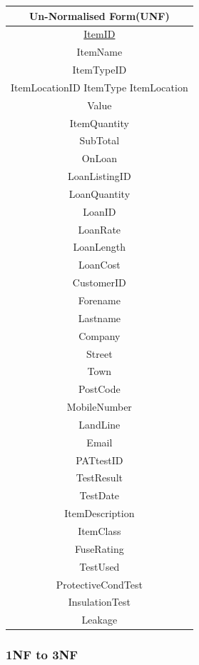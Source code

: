 \begin{center}
    \begin{tabular}{|c|}
        \hline
        \textbf{Un-Normalised Form(UNF)}\\ \hline
        \underline{ItemID}\\
        ItemName\\
        ItemTypeID\\
        ItemLocationID
        ItemType
        ItemLocation\\ 
        Value\\ 
        ItemQuantity\\ 
        SubTotal\\ 
        OnLoan\\ 
        LoanListingID\\ 
        LoanQuantity\\
        LoanID\\ 
        LoanRate\\ 
        LoanLength\\ 
        LoanCost\\ 
        CustomerID\\ 
        Forename\\ 
        Lastname\\ 
        Company\\ 
        Street\\ 
        Town\\ 
        PostCode\\ 
        MobileNumber\\ 
        LandLine\\ 
        Email\\ 
        PATtestID\\
        TestResult\\ 
        TestDate\\ 
        ItemDescription\\ 
        ItemClass\\ 
        FuseRating\\ 
        TestUsed\\ 
        ProtectiveCondTest\\ 
        InsulationTest\\ 
        Leakage\\ \hline
    \end{tabular}
\end{center}

\newpage

\subsubsection{1NF to 3NF}


